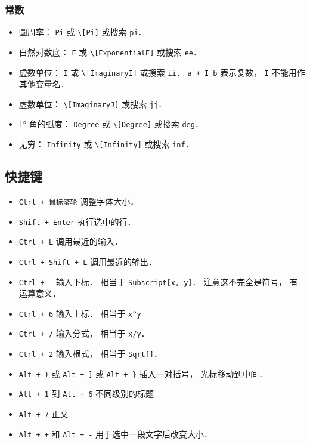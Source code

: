 \subsubsection{常数}

\begin{itemize}
\item 圆周率： \verb|Pi| 或 \verb|\[Pi]| 或搜索 \verb|pi|．
\item 自然对数底： \verb|E| 或 \verb|\[ExponentialE]| 或搜索 \verb|ee|．
\item 虚数单位： \verb|I| 或 \verb|\[ImaginaryI]| 或搜索 \verb|ii|． \verb|a + I b| 表示复数， \verb|I| 不能用作其他变量名．
\item 虚数单位： \verb|\[ImaginaryJ]| 或搜索 \verb|jj|．
\item 1° 角的弧度： \verb|Degree| 或 \verb|\[Degree]| 或搜索 \verb|deg|．
\item 无穷： \verb|Infinity| 或 \verb|\[Infinity]| 或搜索 \verb|inf|．
\end{itemize}

\subsection{快捷键}
\begin{itemize}
\item \verb|Ctrl + 鼠标滚轮| 调整字体大小．
\item \verb|Shift + Enter| 执行选中的行．
\item \verb|Ctrl + L| 调用最近的输入．
\item \verb|Ctrl + Shift + L| 调用最近的输出．
\item \verb|Ctrl + -| 输入下标． 相当于 \verb|Subscript[x, y]|． 注意这不完全是符号， 有运算意义．
\item \verb|Ctrl + 6| 输入上标． 相当于 \verb|x^y|
\item \verb|Ctrl + /| 输入分式， 相当于 \verb|x/y|．
\item \verb|Ctrl + 2| 输入根式， 相当于 \verb|Sqrt[]|．
\item \verb|Alt + )| 或 \verb|Alt + ]| 或 \verb|Alt + }| 插入一对括号， 光标移动到中间．
\item \verb|Alt + 1| 到 \verb|Alt + 6| 不同级别的标题
\item \verb|Alt + 7| 正文
\item \verb|Alt + +| 和 \verb|Alt + -| 用于选中一段文字后改变大小．
\end{itemize}

